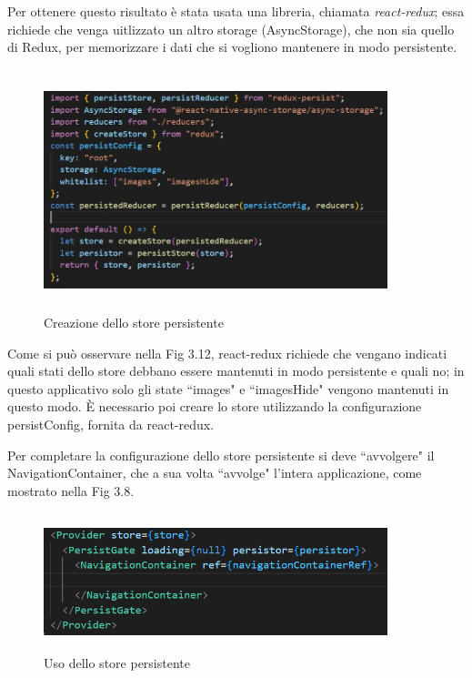 Per ottenere questo risultato \`e stata usata una libreria, chiamata \textit{react-redux}; essa richiede che venga uitlizzato un altro storage {}(AsyncStorage), che non sia quello di Redux, per memorizzare i dati che si vogliono mantenere in modo persistente.
\begin{figure}[h]
    \centering
    \includegraphics[width=10cm, height=7cm]{images/persistStore.jpg}
    \caption[differenzeiteot]{Creazione dello store persistente}
    \label{fig:persistStore}
\end{figure}

Come si pu\`o osservare nella Fig 3.12, react-redux richiede che vengano indicati quali stati dello store debbano essere mantenuti in modo persistente e quali no; in questo applicativo solo gli state ``images" e ``imagesHide" vengono mantenuti in questo modo.
\`E necessario poi creare lo store utilizzando la configurazione persistConfig, fornita da react-redux.

Per completare la configurazione dello store persistente si deve ``avvolgere" il NavigationContainer, che a sua volta ``avvolge" l'intera applicazione, come mostrato nella Fig 3.8.
\begin{figure}[h]
    \centering
    \includegraphics[width=10cm, height=4cm]{images/WrapNavigationConteiner.png}
    \caption[differenzeiteot]{Uso dello store persistente}
    \label{fig:usoStorePersistente}
\end{figure}

